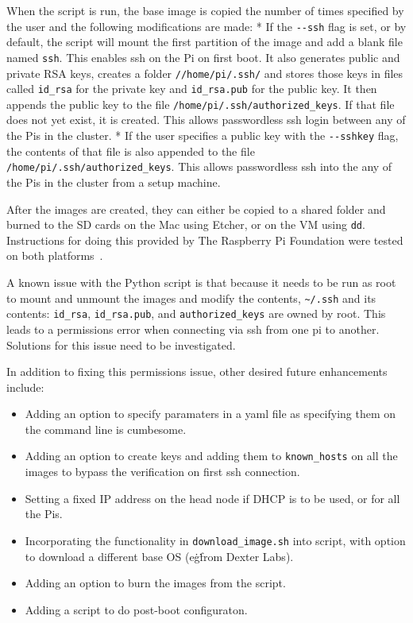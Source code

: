 When the script is run, the base image is copied the number of times
specified by the user and the following modifications are made: * If
the \verb|--ssh| flag is set, or by default, the script will mount the
first partition of the image and add a blank file
named \verb|ssh|. This enables ssh on the Pi on first boot. It also
generates public and private RSA keys, creates a
folder \verb|//home/pi/.ssh/| and stores those keys in files
called \verb|id_rsa| for the private key and \verb|id_rsa.pub| for the
public key. It then appends the public key to the
file \verb|/home/pi/.ssh/authorized_keys|. If that file does not yet
exist, it is created. This allows passwordless ssh login between any
of the Pis in the cluster.  * If the user specifies a public key with
the \verb|--sshkey| flag, the contents of that file is also appended
to the file \verb|/home/pi/.ssh/authorized_keys|. This allows
passwordless ssh into the any of the Pis in the cluster from a setup
machine.

After the images are created, they can either be copied to a shared
folder and burned to the SD cards on the Mac using Etcher, or on the
VM using \verb|dd|. Instructions for doing this provided by The
Raspberry Pi Foundation were tested on both
platforms~\cite{hid-sp18-419-raspbian-burn}.

A known issue with the Python script is that because it needs to be
run as root to mount and unmount the images and modify the
contents, \verb|~/.ssh| and its contents: \verb|id_rsa|,
\verb|id_rsa.pub|, and \verb|authorized_keys| are owned by root.
This leads to a permissions error when connecting via ssh from one pi
to another. Solutions for this issue need to be investigated.

In addition to fixing this permissions issue, other desired future
enhancements include:

\begin{itemize}
        \item Adding an option to specify paramaters in a yaml file as
        specifying them on the command line is cumbesome.
        \item Adding an option to create keys and adding them
        to \verb|known_hosts| on all the images to bypass the
        verification on first ssh connection.
        \item Setting a fixed
        IP address on the head node if DHCP is to be used, or for all
        the Pis.
        \item Incorporating the functionality
        in \verb|download_image.sh| into script, with option to
        download a different base OS (e\.g\. from Dexter Labs).
        \item Adding an option to burn the images from the script.
        \item Adding a script to do post-boot configuraton.
\end{itemize}

